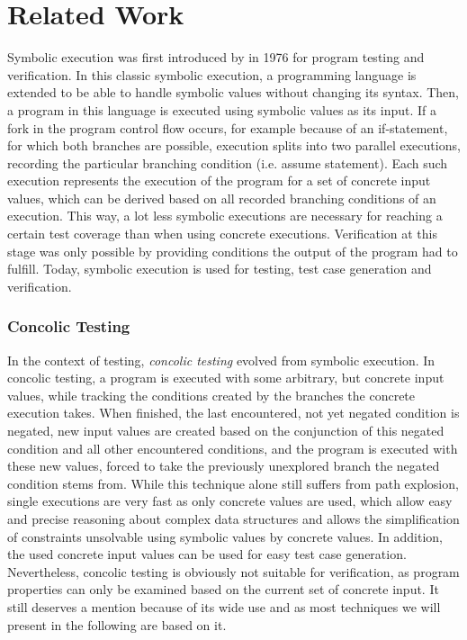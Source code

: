 \chapter{Related Work}
\label{sec:relatedWork}
Symbolic execution was first introduced by \cite{King1976} in 1976 for program testing and verification.
In this classic symbolic execution, a programming language is extended to be able to handle symbolic values without changing its syntax.
Then, a program in this language is executed using symbolic values as its input.
If a fork in the program control flow occurs, for example because of an if-statement, for which both branches are possible, execution splits into two parallel executions,
recording the particular branching condition (i.e. assume statement).
Each such execution represents the execution of the program for a set of concrete input values, which can be derived based on all recorded branching conditions of an execution.
This way, a lot less symbolic executions are necessary for reaching a certain test coverage than when using concrete executions.
Verification at this stage was only possible by providing conditions the output of the program had to fulfill.
Today, symbolic execution is used for testing, test case generation and verification.

\subsection*{Concolic Testing}
In the context of testing, \emph{concolic testing} \cite{Sen2005} \cite{Godefroid2005} \cite{Majumdar2007} evolved from symbolic execution.
In concolic testing, a program is executed with some arbitrary, but concrete input values, while tracking the conditions created by the branches the concrete execution takes.
When finished, the last encountered, not yet negated condition is negated, new input values are created based on the conjunction of this negated condition and all other encountered conditions, and
the program is executed with these new values, forced to take the previously unexplored branch the negated condition stems from.
While this technique alone still suffers from path explosion, single executions are very fast as only concrete values are used, which allow easy and precise reasoning about complex data structures \cite{Burnim2008} and allows the simplification of constraints unsolvable using symbolic values by concrete values.
In addition, the used concrete input values can be used for easy test case generation.
Nevertheless, concolic testing is obviously not suitable for verification, as program properties can only be examined based on the current set of concrete input.
It still deserves a mention because of its wide use and as most techniques we will present in the following are based on it.

